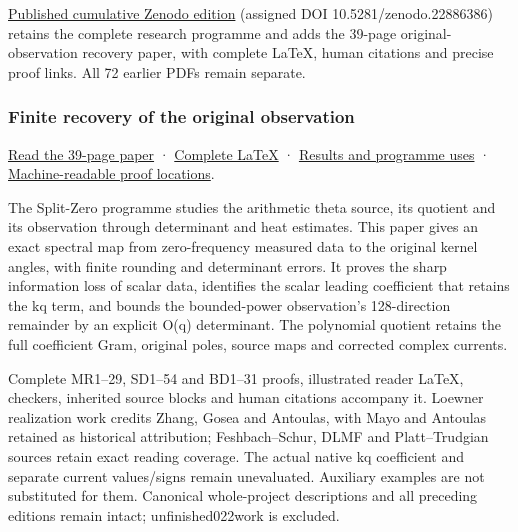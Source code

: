 \documentclass[
]{article}
\begin{document}
\href{https://zenodo.org/records/22886386}{Published cumulative Zenodo
edition} (assigned DOI 10.5281/zenodo.22886386) retains the complete
research programme and adds the 39-page original-observation recovery
paper, with complete LaTeX, human citations and precise proof links. All
72 earlier PDFs remain separate.

\subsubsection{Finite recovery of the original
observation}\label{finite-recovery-of-the-original-observation}

\href{https://github.com/KokunoYumeto/zeta-function-research-reader/blob/main/workbenches/splitzero-tandem/continuations/20260922-original-observation-recovery/ORIGINAL_OBSERVATION_RECOVERY_READER.pdf}{Read
the 39-page paper} ·
\href{https://github.com/KokunoYumeto/zeta-function-research-reader/blob/main/workbenches/splitzero-tandem/continuations/20260922-original-observation-recovery/ORIGINAL_OBSERVATION_RECOVERY_READER.tex}{Complete
LaTeX} ·
\href{https://github.com/KokunoYumeto/zeta-function-research-reader/blob/main/workbenches/splitzero-tandem/continuations/20260922-original-observation-recovery/RESULTS_20260922_021.md}{Results
and programme uses} ·
\href{https://github.com/KokunoYumeto/zeta-function-research-reader/blob/main/workbenches/splitzero-tandem/continuations/20260922-original-observation-recovery/RESULT_INDEX.json}{Machine-readable
proof locations}.

The Split-Zero programme studies the arithmetic theta source, its
quotient and its observation through determinant and heat estimates.
This paper gives an exact spectral map from zero-frequency measured data
to the original kernel angles, with finite rounding and determinant
errors. It proves the sharp information loss of scalar data, identifies
the scalar leading coefficient that retains the kq term, and bounds the
bounded-power observation's 128-direction remainder by an explicit O(q)
determinant. The polynomial quotient retains the full coefficient Gram,
original poles, source maps and corrected complex currents.

Complete MR1--29, SD1--54 and BD1--31 proofs, illustrated reader LaTeX,
checkers, inherited source blocks and human citations accompany it.
Loewner realization work credits Zhang, Gosea and Antoulas, with Mayo
and Antoulas retained as historical attribution; Feshbach--Schur, DLMF
and Platt--Trudgian sources retain exact reading coverage. The actual
native kq coefficient and separate current values/signs remain
unevaluated. Auxiliary examples are not substituted for them. Canonical
whole-project descriptions and all preceding editions remain intact;
unfinished022work is excluded.
\end{document}
